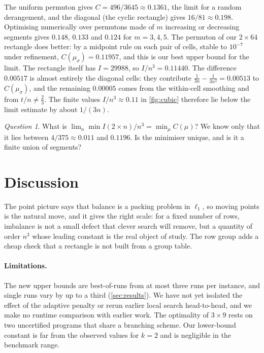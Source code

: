 \documentclass[11pt]{article}
\theoremstyle{plain}
\theoremstyle{definition}
\theoremstyle{remark}
\newtheorem*{question}{Question}
\begin{document}
The uniform permuton gives $C=496/3645\approx0.1361$, the limit for a random derangement, and the
diagonal (the cyclic rectangle) gives $16/81\approx0.198$. Optimising numerically over permutons
made of $m$ increasing or decreasing segments gives $0.148$, $0.133$ and $0.124$ for $m=3,4,5$.
The permuton of our $2\times64$ rectangle does better: by a midpoint rule on each pair of cells,
stable to $10^{-7}$ under refinement, $C(\mu_\sigma)=0.11957$, and this is our best upper bound for
the limit. The rectangle itself has $I=29988$, so $I/n^3=0.11440$. The difference $0.00517$ is almost
entirely the diagonal cells: they contribute $\frac1{3n}-\frac1{3n^2}=0.00513$ to $C(\mu_\sigma)$,
and the remaining $0.00005$ comes from the within-cell smoothing and from $t/n\ne\frac23$. The finite
values $I/n^3\approx0.11$ in \cref{fig:cubic} therefore lie below the limit estimate by about
$1/(3n)$.

\begin{question}
What is $\lim_n\min I(2\times n)/n^3=\min_\mu C(\mu)$? We know only that it lies between
$4/375\approx0.011$ and $0.1196$. Is the minimiser unique, and is it a finite union of
segments?
\end{question}

\section{Discussion}

The point picture says that balance is a packing problem in $\ell_1$, so moving points is the
natural move, and it gives the right scale: for a fixed number of rows, imbalance is not a small
defect that clever search will remove, but a quantity of order $n^3$ whose leading constant is
the real object of study. The row group adds a cheap check that a rectangle is not built from a
group table.

\paragraph{Limitations.} The new upper bounds are best-of-runs from at most three runs per
instance, and single runs vary by up to a third (\cref{sec:results}). We have not yet isolated
the effect of the adaptive penalty or rerun earlier local search head-to-head, and we make no
runtime comparison with earlier work. The optimality of $3\times 9$ rests on two uncertified programs
that share a branching scheme. Our lower-bound constant is far from the observed values for $k=2$
and is negligible in the benchmark range.
\end{document}
